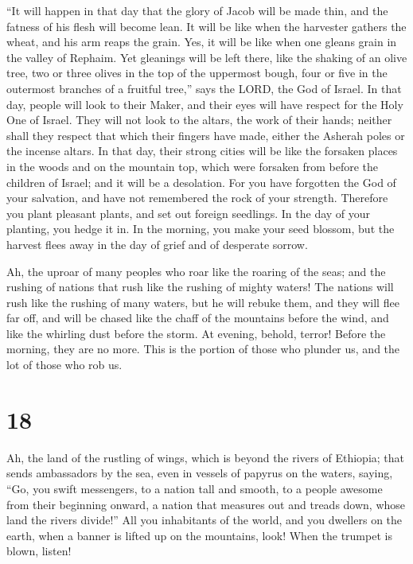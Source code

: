  ``It will happen in that day that the glory of Jacob will
be made thin, and the fatness of his flesh will become lean.
 It will be like when the harvester gathers the wheat, and
his arm reaps the grain. Yes, it will be like when one gleans grain in
the valley of Rephaim.  Yet gleanings will be left there,
like the shaking of an olive tree, two or three olives in the top of the
uppermost bough, four or five in the outermost branches of a fruitful
tree,'' says the LORD, the God of Israel.  In that day,
people will look to their Maker, and their eyes will have respect for
the Holy One of Israel.  They will not look to the altars,
the work of their hands; neither shall they respect that which their
fingers have made, either the Asherah poles or the incense altars.
 In that day, their strong cities will be like the forsaken
places in the woods and on the mountain top, which were forsaken from
before the children of Israel; and it will be a desolation.
 For you have forgotten the God of your salvation, and have
not remembered the rock of your strength. Therefore you plant pleasant
plants, and set out foreign seedlings.  In the day of your
planting, you hedge it in. In the morning, you make your seed blossom,
but the harvest flees away in the day of grief and of desperate sorrow.

 Ah, the uproar of many peoples who roar like the roaring
of the seas; and the rushing of nations that rush like the rushing of
mighty waters!  The nations will rush like the rushing of
many waters, but he will rebuke them, and they will flee far off, and
will be chased like the chaff of the mountains before the wind, and like
the whirling dust before the storm.  At evening, behold,
terror! Before the morning, they are no more. This is the portion of
those who plunder us, and the lot of those who rob us.

\hypertarget{section-17}{%
\section{18}\label{section-17}}

 Ah, the land of the rustling of wings, which is beyond the
rivers of Ethiopia;  that sends ambassadors by the sea, even
in vessels of papyrus on the waters, saying, ``Go, you swift messengers,
to a nation tall and smooth, to a people awesome from their beginning
onward, a nation that measures out and treads down, whose land the
rivers divide!''  All you inhabitants of the world, and you
dwellers on the earth, when a banner is lifted up on the mountains,
look! When the trumpet is blown, listen!

